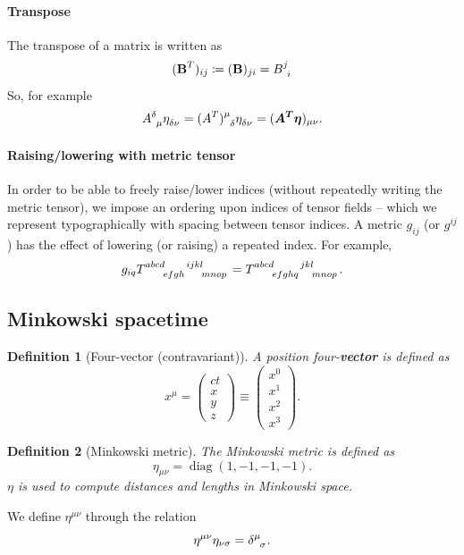 \documentclass[11pt]{article}
\numberwithin{equation}{section}
\newcommand{\defeq}{\coloneqq}
\DeclareMathOperator{\diag}{diag}
\newtheorem{defn}{Definition}[section]
\begin{document}
\paragraph{Transpose} The transpose of a matrix is written as
\begin{equation}
(\textbf{B}^T)_{ij} \defeq (\textbf{B})_{ji} =  \tensor{B}{^j_i} \label{eq:transpose-einstein-notation}
\end{equation}
So, for example
\begin{equation}
\tensor{A}{^\delta_\mu} \tensor{\eta}{_\delta _\nu} = \tensor{(\protect{A^T})}{^\mu_\delta} \tensor{\eta}{_\delta _\nu}  = (\boldsymbol{A^T \eta})_{\mu \nu}. \label{eq:complicated-example-matrix-mul-transp}
\end{equation}

\paragraph{Raising/lowering with metric tensor} In order to be able to freely raise/lower indices (without repeatedly writing the metric tensor), we impose an ordering upon indices of tensor fields -- which we represent typographically with spacing between tensor indices. A metric $g_{ij}$ (or $g^{ij}$) has the effect of lowering (or raising) a repeated index. For example,
\begin{equation}
g_{iq} \tensor{T}{^{abcd}_{efgh}^{ijkl}_{mnop}}  = \tensor{T}{^{abcd}_{efghq}^{jkl}_{mnop}}.
\end{equation}

\subsection{Minkowski spacetime}

\begin{defn}[Four-vector (contravariant)]
A position four-\textbf{vector} is defined as
\begin{equation}
x^\mu = \begin{pmatrix}ct\\x\\y\\z\end{pmatrix} \equiv \begin{pmatrix}x^0\\x^1\\x^2\\x^3\end{pmatrix}.
\end{equation}
\end{defn}
\begin{defn}[Minkowski metric]
The Minkowski metric is defined as 
\begin{equation}
\eta_{\mu \nu} = \diag(1,-1,-1,-1). \label{eq:def-minkowski-metric}
\end{equation}
$\eta$ is used to compute distances and lengths in Minkowski space.
\end{defn}
\noindent We define $\eta^{\mu \nu}$ through the relation
\begin{equation}
\eta^{\mu \nu} \eta_{\nu \sigma} = \tensor{\delta}{^\mu_\sigma}.
\end{equation}
\end{document}
